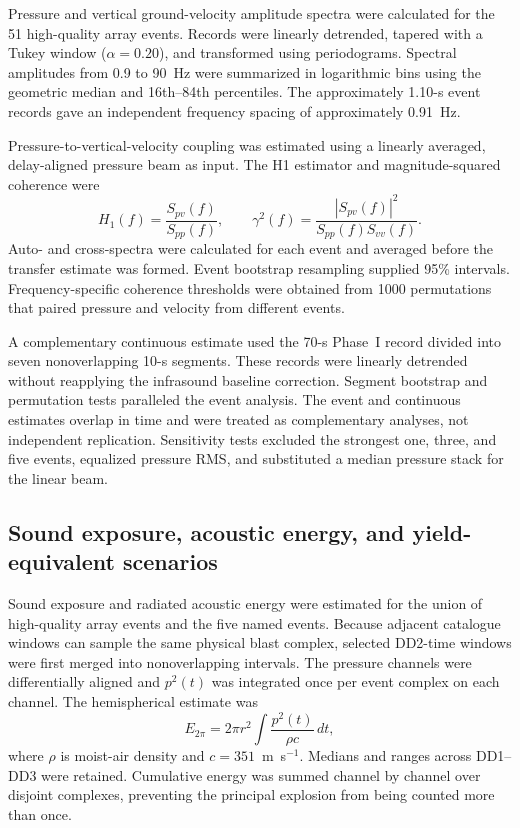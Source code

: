 \documentclass[]{seismica}
\begin{document}
Pressure and vertical ground-velocity amplitude spectra were calculated for the
51 high-quality array events. Records were linearly detrended, tapered with a
Tukey window ($\alpha=0.20$), and transformed using periodograms. Spectral
amplitudes from 0.9 to 90~Hz were summarized in logarithmic bins using the
geometric median and 16th--84th percentiles. The approximately 1.10-s event
records gave an independent frequency spacing of approximately 0.91~Hz.

Pressure-to-vertical-velocity coupling was estimated using a linearly averaged,
delay-aligned pressure beam as input. The H1 estimator and magnitude-squared
coherence were
\begin{equation}
  H_1(f)=\frac{S_{pv}(f)}{S_{pp}(f)}, \qquad
  \gamma^2(f)=\frac{|S_{pv}(f)|^2}{S_{pp}(f)S_{vv}(f)}.
  \label{eq:h1_transfer}
\end{equation}
Auto- and cross-spectra were calculated for each event and averaged before the
transfer estimate was formed. Event bootstrap resampling supplied 95\%
intervals. Frequency-specific coherence thresholds were obtained from 1000
permutations that paired pressure and velocity from different events.

A complementary continuous estimate used the 70-s Phase~I record divided into
seven nonoverlapping 10-s segments. These records were linearly detrended
without reapplying the infrasound baseline correction. Segment bootstrap and
permutation tests paralleled the event analysis. The event and continuous
estimates overlap in time and were treated as complementary analyses, not
independent replication. Sensitivity tests excluded the strongest one, three,
and five events, equalized pressure RMS, and substituted a median pressure
stack for the linear beam.

\subsection{Sound exposure, acoustic energy, and yield-equivalent scenarios}

Sound exposure and radiated acoustic energy were estimated for the union of
high-quality array events and the five named events. Because adjacent catalogue
windows can sample the same physical blast complex, selected DD2-time windows
were first merged into nonoverlapping intervals. The pressure channels were
differentially aligned and $p^2(t)$ was integrated once per event complex on
each channel. The hemispherical estimate was
\begin{equation}
  E_{2\pi}=2\pi r^2\int\frac{p^2(t)}{\rho c}\,dt,
  \label{eq:acoustic_energy}
\end{equation}
where $\rho$ is moist-air density and $c=351$~m~s$^{-1}$. Medians and ranges
across DD1--DD3 were retained. Cumulative energy was summed channel by channel
over disjoint complexes, preventing the principal explosion from being counted
more than once.
\end{document}
